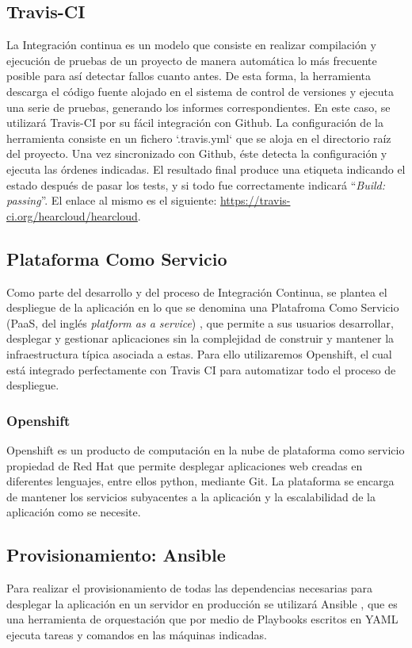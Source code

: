 \subsection{Travis-CI}
La Integración continua es un modelo que consiste en realizar compilación y ejecución de pruebas de un proyecto de manera automática lo más frecuente posible para así detectar fallos cuanto antes. De esta forma, la herramienta descarga el código fuente alojado en el sistema de control de versiones y ejecuta una serie de pruebas, generando los informes correspondientes. En este caso, se utilizará Travis-CI \cite{TravisCI} por su fácil integración con Github. La configuración de la herramienta consiste en un fichero `.travis.yml` que se aloja en el directorio raíz del proyecto. Una vez sincronizado con Github, éste detecta la configuración y ejecuta las órdenes indicadas. El resultado final produce una etiqueta indicando el estado después de pasar los tests, y si todo fue correctamente indicará ``\textit{Build: passing}''. El enlace al mismo es el siguiente: \url{https://travis-ci.org/hearcloud/hearcloud}.

\subsection{Plataforma Como Servicio}
Como parte del desarrollo y del proceso de Integración Continua, se plantea el despliegue de la aplicación en lo que se denomina una Platafroma Como Servicio (PaaS, del inglés \textit{platform as a service}) \cite{PaaS}, que permite a sus usuarios desarrollar, desplegar y gestionar aplicaciones sin la complejidad de construir y mantener la infraestructura típica asociada a estas. Para ello utilizaremos Openshift, el cual está integrado perfectamente con Travis CI para automatizar todo el proceso de despliegue. 

\subsubsection{Openshift}
Openshift \cite{Openshift} es un producto de computación en la nube de plataforma como servicio propiedad de Red Hat que permite desplegar aplicaciones web creadas en diferentes lenguajes, entre ellos python, mediante Git. La plataforma se encarga de mantener los servicios subyacentes a la aplicación y la escalabilidad de la aplicación como se necesite. 

\subsection{Provisionamiento: Ansible}
Para realizar el provisionamiento de todas las dependencias necesarias para desplegar la aplicación en un servidor en producción se utilizará Ansible \cite{Ansible}, que es una herramienta de orquestación que por medio de Playbooks escritos en YAML \cite{YAML} ejecuta tareas y comandos en las máquinas indicadas.

